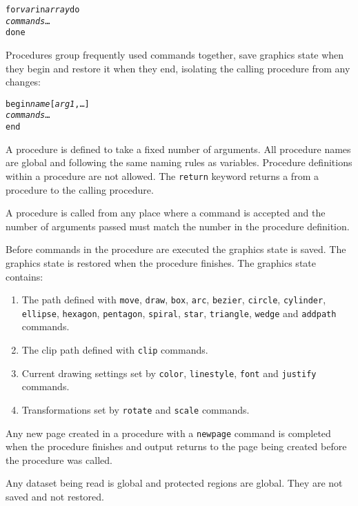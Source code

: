 \begin{alltt}
for \textit{var} in \textit{array} do
  \textit{commands} \dots
done
\end{alltt}

Procedures group frequently used commands together, save
graphics state when they begin and restore it when they end,
isolating the calling procedure from any changes:

\begin{alltt}
begin \textit{name} [\textit{arg1}, \dots]
  \textit{commands} \dots
end
\end{alltt}

A procedure is defined to take a fixed number of arguments.
All procedure names are global and following the same naming
rules as variables.
Procedure definitions within a procedure are not allowed.
The \texttt{return} keyword returns a
from a procedure to the calling procedure.

A procedure is called from any place where a command is accepted
and the number of arguments passed must match the number 
in the procedure definition.

Before commands in the procedure are executed
the graphics state is saved.
\label{graphicsstate}
The graphics state is restored when the procedure finishes.
The graphics state contains:

\begin{enumerate}
\item
The path defined with
\texttt{move},
\texttt{draw},
\texttt{box},
\texttt{arc},
\texttt{bezier},
\texttt{circle},
\texttt{cylinder},
\texttt{ellipse},
\texttt{hexagon},
\texttt{pentagon},
\texttt{spiral},
\texttt{star},
\texttt{triangle},
\texttt{wedge}
and
\texttt{addpath}
commands.

\item
The clip path defined with
\texttt{clip} commands.

\item
Current drawing settings set by
\texttt{color},
\texttt{linestyle},
\texttt{font} and \texttt{justify}
commands.

\item
Transformations set by \texttt{rotate} and \texttt{scale} commands.
\end{enumerate}

Any new page created in a procedure with a
\texttt{newpage}
command is completed when the procedure finishes and output
returns to the page being created before the procedure was called.

Any dataset being read is global and protected regions are global.
They are not saved and not restored.

